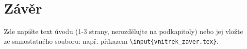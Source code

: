 \documentclass[a4paper,twoside,12pt]{scrbook}
\begin{document}
%
%
%
%



\chapter*{Závěr} %
%
Zde napište text úvodu (1-3 strany, nerozdělujte na podkapitoly) nebo jej vložte ze samostatného souboru: např. příkazem \texttt{\textbackslash input\{vnitrek\_zaver.tex\}}.
%
%


\clearpage  %
\end{document}
